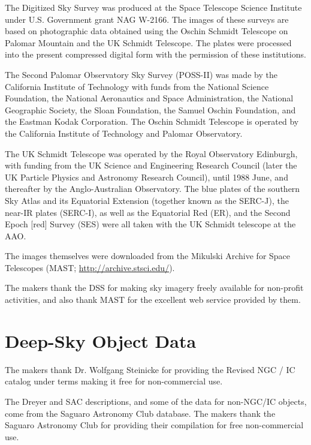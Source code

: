 The Digitized Sky Survey was produced at the Space Telescope Science
Institute under U.S. Government grant NAG W-2166. The images of these
surveys are based on photographic data obtained using the Oschin
Schmidt Telescope on Palomar Mountain and the UK Schmidt
Telescope. The plates were processed into the present compressed
digital form with the permission of these institutions.

The Second Palomar Observatory Sky Survey (POSS-II) was made by the
California Institute of Technology with funds from the National
Science Foundation, the National Aeronautics and Space Administration,
the National Geographic Society, the Sloan Foundation, the Samuel
Oschin Foundation, and the Eastman Kodak Corporation. The Oschin
Schmidt Telescope is operated by the California Institute of
Technology and Palomar Observatory.

The UK Schmidt Telescope was operated by the Royal Observatory
Edinburgh, with funding from the UK Science and Engineering Research
Council (later the UK Particle Physics and Astronomy Research
Council), until 1988 June, and thereafter by the Anglo-Australian
Observatory. The blue plates of the southern Sky Atlas and its
Equatorial Extension (together known as the SERC-J), the near-IR
plates (SERC-I), as well as the Equatorial Red (ER), and the Second
Epoch [red] Survey (SES) were all taken with the UK Schmidt telescope
at the AAO.

The images themselves were downloaded from the Mikulski Archive for
Space Telescopes (MAST; \url{http://archive.stsci.edu/}).

The makers thank the DSS for making sky imagery freely available for
non-profit activities, and also thank MAST for the excellent web
service provided by them.

\section*{Deep-Sky Object Data}

The makers thank Dr. Wolfgang Steinicke for providing the Revised NGC
/ IC catalog under terms making it free for non-commercial use.

The Dreyer and SAC descriptions, and some of the data for non-NGC/IC
objects, come from the Saguaro Astronomy Club database. The makers
thank the Saguaro Astronomy Club for providing their compilation for
free non-commercial use.
